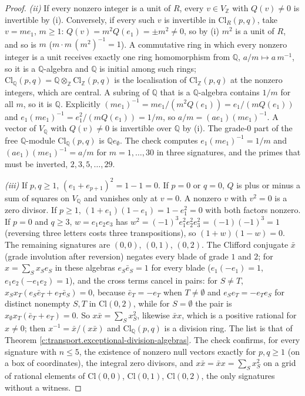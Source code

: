 \documentclass[11pt]{article}
\theoremstyle{definition}
\theoremstyle{plain}
\providecommand{\Cl}{}\renewcommand{\Cl}{\mathrm{Cl}}
\providecommand{\Q}{}\renewcommand{\Q}{\mathbb{Q}}
\providecommand{\Z}{}\renewcommand{\Z}{\mathbb{Z}}
\begin{document}
\begin{proof}
\emph{(ii)} If every nonzero integer is a unit of $R$, every $v \in V_{\Z}$ with $Q(v) \ne 0$ is invertible by (i). Conversely, if every such $v$ is invertible in $\Cl_{R}(p,q)$, take $v = me_{1}$, $m \ge 1$: $Q(v) = m^{2}Q(e_{1}) = \pm m^{2} \ne 0$, so by (i) $m^{2}$ is a unit of $R$, and so is $m$ ($m \cdot m\,(m^{2})^{-1} = 1$). A commutative ring in which every nonzero integer is a unit receives exactly one ring homomorphism from $\Q$, $a/m \mapsto a\,m^{-1}$, so it is a $\Q$-algebra and $\Q$ is initial among such rings; $\Cl_{\Q}(p,q) = \Q \otimes_{\Z} \Cl_{\Z}(p,q)$ is the localisation of $\Cl_{\Z}(p,q)$ at the nonzero integers, which are central. A subring of $\Q$ that is a $\Q$-algebra contains $1/m$ for all $m$, so it is $\Q$. Explicitly $(me_{1})^{-1} = me_{1}/(m^{2}Q(e_{1})) = e_{1}/(mQ(e_{1}))$ and $e_{1}(me_{1})^{-1} = e_{1}^{2}/(mQ(e_{1})) = 1/m$, so $a/m = (ae_{1})(me_{1})^{-1}$. A vector of $V_{\Q}$ with $Q(v) \ne 0$ is invertible over $\Q$ by (i). The grade-$0$ part of the free $\Q$-module $\Cl_{\Q}(p,q)$ is $\Q e_{\emptyset}$. The check computes $e_{1}(me_{1})^{-1} = 1/m$ and $(ae_{1})(me_{1})^{-1} = a/m$ for $m = 1, \dots, 30$ in three signatures, and the primes that must be inverted, $2, 3, 5, \dots, 29$.

\emph{(iii)} If $p, q \ge 1$, $(e_{1} + e_{p+1})^{2} = 1 - 1 = 0$. If $p = 0$ or $q = 0$, $Q$ is plus or minus a sum of squares on $V_{\Q}$ and vanishes only at $v = 0$. A nonzero $v$ with $v^{2} = 0$ is a zero divisor. If $p \ge 1$, $(1 + e_{1})(1 - e_{1}) = 1 - e_{1}^{2} = 0$ with both factors nonzero. If $p = 0$ and $q \ge 3$, $w = e_{1}e_{2}e_{3}$ has $w^{2} = (-1)^{3}e_{1}^{2}e_{2}^{2}e_{3}^{2} = (-1)(-1)^{3} = 1$ (reversing three letters costs three transpositions), so $(1 + w)(1 - w) = 0$. The remaining signatures are $(0,0)$, $(0,1)$, $(0,2)$. The Clifford conjugate $\bar{x}$ (grade involution after reversion) negates every blade of grade $1$ and $2$; for $x = \sum_{S}x_{S}e_{S}$ in these algebras $e_{S}\bar{e}_{S} = 1$ for every blade ($e_{1}(-e_{1}) = 1$, $e_{1}e_{2}(-e_{1}e_{2}) = 1$), and the cross terms cancel in pairs: for $S \ne T$, $x_{S}x_{T}(e_{S}\bar{e}_{T} + e_{T}\bar{e}_{S}) = 0$, because $\bar{e}_{T} = -e_{T}$ when $T \ne \emptyset$ and $e_{S}e_{T} = -e_{T}e_{S}$ for distinct nonempty $S, T$ in $\Cl(0,2)$, while for $S = \emptyset$ the pair is $x_{\emptyset}x_{T}(\bar{e}_{T} + e_{T}) = 0$. So $x\bar{x} = \sum_{S}x_{S}^{2}$, likewise $\bar{x}x$, which is a positive rational for $x \ne 0$; then $x^{-1} = \bar{x}/(x\bar{x})$ and $\Cl_{\Q}(p,q)$ is a division ring. The list is that of Theorem \ref{c:transport.exceptional-division-algebras}. The check confirms, for every signature with $n \le 5$, the existence of nonzero null vectors exactly for $p, q \ge 1$ (on a box of coordinates), the integral zero divisors, and $x\bar{x} = \bar{x}x = \sum_{S}x_{S}^{2}$ on a grid of rational elements of $\Cl(0,0)$, $\Cl(0,1)$, $\Cl(0,2)$, the only signatures without a witness.

\end{proof}
\end{document}
